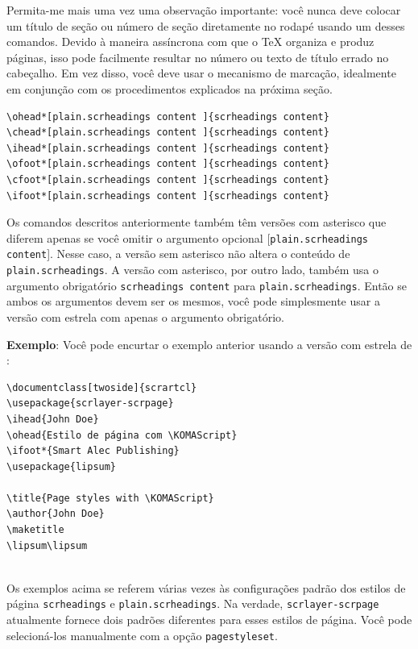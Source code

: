 Permita-me mais uma vez uma observação importante: você nunca deve colocar um título de seção ou número de seção diretamente no rodapé usando um desses comandos. Devido à maneira assíncrona com que o TeX organiza e produz páginas, isso pode facilmente resultar no número ou texto de título errado no cabeçalho. Em vez disso, você deve usar o mecanismo de marcação, idealmente em conjunção com os procedimentos explicados na próxima seção.
\begin{verbatim}
\ohead*[plain.scrheadings content ]{scrheadings content}
\chead*[plain.scrheadings content ]{scrheadings content}
\ihead*[plain.scrheadings content ]{scrheadings content}
\ofoot*[plain.scrheadings content ]{scrheadings content}
\cfoot*[plain.scrheadings content ]{scrheadings content}
\ifoot*[plain.scrheadings content ]{scrheadings content}
\end{verbatim}

Os comandos descritos anteriormente também têm versões com asterisco que diferem apenas se você omitir o argumento opcional [\texttt{plain.scrheadings content}]. Nesse caso, a versão sem asterisco não altera o conteúdo de \texttt{plain.scrheadings}. A versão com asterisco, por outro lado, também usa o argumento obrigatório \texttt{scrheadings content} para \texttt{plain.scrheadings}. Então se ambos os argumentos devem ser os mesmos, você pode simplesmente usar a versão com estrela com apenas o argumento obrigatório.

\textbf{Exemplo}: Você pode encurtar o exemplo anterior usando a versão com estrela de :
\begin{verbatim}
\documentclass[twoside]{scrartcl}
\usepackage{scrlayer-scrpage}
\ihead{John Doe}
\ohead{Estilo de página com \KOMAScript}
\ifoot*{Smart Alec Publishing}
\usepackage{lipsum}

\title{Page styles with \KOMAScript}
\author{John Doe}
\maketitle
\lipsum\lipsum
 
\end{verbatim}

Os exemplos acima se referem várias vezes às configurações padrão dos estilos de página \texttt{scrheadings} e \texttt{plain.scrheadings}. Na verdade, \texttt{scrlayer-scrpage} atualmente fornece dois padrões diferentes para esses estilos de página. Você pode selecioná-los manualmente com a opção \texttt{pagestyleset}.

